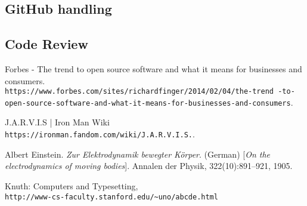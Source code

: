 \documentclass[12pt]{article}
\begin{document}
  \subsection{GitHub handling}
  
  \subsection{Code Review}
  
  
\begin{thebibliography}{9}

Forbes - The trend to open source software and what it means for businesses and consumers.
\\\texttt{https://www.forbes.com/sites/richardfinger/2014/02/04/the-trend
-to-open-source-software-and-what-it-means-for-businesses-and-consumers}.

J.A.R.V.I.S | Iron Man Wiki
\\\texttt{https://ironman.fandom.com/wiki/J.A.R.V.I.S.}.

Albert Einstein. 
\textit{Zur Elektrodynamik bewegter K{\"o}rper}. (German) 
[\textit{On the electrodynamics of moving bodies}]. 
Annalen der Physik, 322(10):891–921, 1905.
 
Knuth: Computers and Typesetting,
\\\texttt{http://www-cs-faculty.stanford.edu/\~{}uno/abcde.html}
\end{thebibliography}
  
\end{document}
